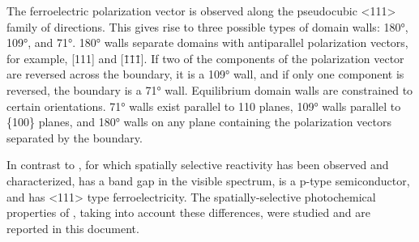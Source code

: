 The ferroelectric polarization vector is observed along the pseudocubic <111> family of
directions.\cite{Catalan:2009ca} This gives rise to three possible types of domain walls:
180\si{\degree}, 109\si{\degree}, and 71\si{\degree}. 180\si{\degree} walls separate
domains with antiparallel polarization vectors, for example, [111] and [\={1}\={1}\={1}].
If two of the components of the polarization vector are reversed across the boundary, it
is a 109\si{\degree} wall, and if only one component is reversed, the boundary is a
71\si{\degree} wall. Equilibrium domain walls are constrained to certain orientations.
71\si{\degree} walls exist parallel to {110} planes, 109\si{\degree} walls parallel to
\{100\} planes, and 180\si{\degree} walls on any plane containing the polarization vectors
separated by the boundary.\cite{Streiffer:1998vt}

In contrast to , for which spatially selective reactivity has been observed and
characterized,  has a band gap in the visible spectrum, is a p-type
semiconductor, and has <111> type ferroelectricity. The spatially-selective photochemical
properties of , taking into account these differences, were studied and are
reported in this document.

